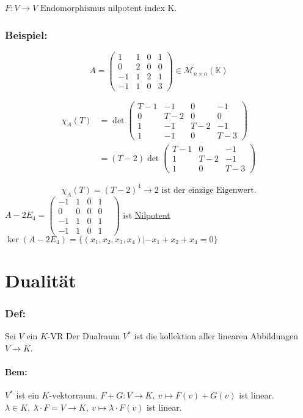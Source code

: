 \documentclass[titlepage,12pt,a4paper,ngerman]{report}
\newcommand{\tx}[1]{\textrm{#1}}
\newcommand{\enph}{F: V \to V \textrm{ Endomorphismus}}
\begin{document}
$ \enph $ nilpotent index K.


\subsection*{Beispiel:}
$$A = \begin{pmatrix}
1 &1&0&1\\0&2&0&0\\-1&1&2&1\\-1&1&0&3
\end{pmatrix} \in \mathcal{M}_{n\times n} (\mathbb{K})$$

\begin{align*} \chi_A(T) &= \det\begin{pmatrix}
T-1 & -1 & 0 & -1\\ 0 & T-2 & 0 & 0 \\ 1 & -1 & T-2 & -1 \\ 1 & -1 & 0 & T-3
\end{pmatrix}\\[8pt]
&= (T-2) \det \begin{pmatrix}
T-1 & 0 & -1 \\ 1 & T-2 & -1 \\ 1 & 0 & T-3
\end{pmatrix}\end{align*}

$$\chi_A (T) = (T-2)^4 \rightarrow 2 \tx{ ist der einzige Eigenwert.}$$
$A-2 E_4 = \begin{pmatrix}
-1&1&0&1\\0&0&0&0&\\-1&1&0&1\\-1&1&0&1
\end{pmatrix}$ ist \underline{\underline{Nilpotent}}\\
$ \ker(A - 2 E_4) = \{(x_1,x_2,x_3,x_4) | -x_1 +x_2 + x_4 = 0\} $


\chapter{Dualität}

\subsection{Def:}
Sei $V$ ein $K$-VR Der Dualraum $V^*$ ist die kollektion aller linearen Abbildungen $V \to K$.
\subsubsection{Bem:} $V^*$ ist ein $K$-vektorraum. $F + G: V\to K, \ v\mapsto F(v) + G(v)$ ist linear.\\
$\lambda \in K, \ \lambda \cdot F = V \to K, \ v \mapsto \lambda \cdot F(v)$ ist linear.
\end{document}

